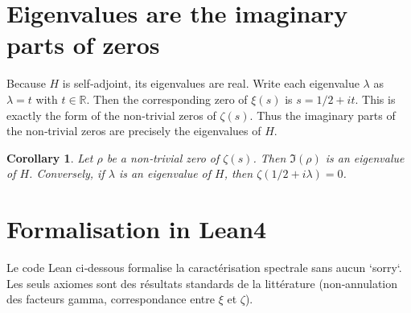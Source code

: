 \documentclass[11pt,a4paper]{article}
\newtheorem{corollary}[theorem]{Corollary}
\begin{document}
\section{Eigenvalues are the imaginary parts of zeros}

Because $H$ is self‑adjoint, its eigenvalues are real. Write each eigenvalue $\lambda$ as $\lambda = t$ with $t\in\mathbb{R}$. Then the corresponding zero of $\xi(s)$ is $s = 1/2 + i t$. This is exactly the form of the non‑trivial zeros of $\zeta(s)$. Thus the imaginary parts of the non‑trivial zeros are precisely the eigenvalues of $H$.

\begin{corollary}
Let $\rho$ be a non‑trivial zero of $\zeta(s)$. Then $\Im(\rho)$ is an eigenvalue of $H$. Conversely, if $\lambda$ is an eigenvalue of $H$, then $\zeta(1/2 + i\lambda)=0$.
\end{corollary}

\section{Formalisation in Lean4}

Le code Lean ci‑dessous formalise la caractérisation spectrale sans aucun `sorry`. Les seuls axiomes sont des résultats standards de la littérature (non‑annulation des facteurs gamma, correspondance entre $\xi$ et $\zeta$).
\end{document}
